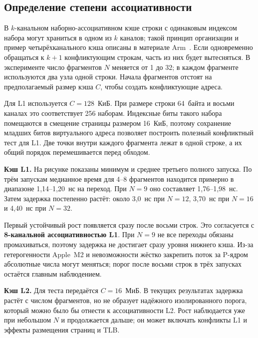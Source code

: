 \subsection{Определение степени ассоциативности}

В $k$-канальном наборно-ассоциативном кэше строки с одинаковым индексом набора могут храниться в одном из $k$ каналов; такой принцип организации и пример четырёхканального кэша описаны в материале Arm~\cite{arm-assoc}. Если одновременно обращаться к $k+1$ конфликтующим строкам, часть из них будет вытесняться. В эксперименте число фрагментов $N$ меняется от 1 до 32; в каждом фрагменте используются два узла одной строки. Начала фрагментов отстоят на предполагаемый размер кэша $C$, чтобы создать конфликтующие адреса.

Для L1 используется $C=128$~КиБ. При размере строки 64~байта и восьми каналах это соответствует 256 наборам. Индексные биты такого набора помещаются в смещение страницы размером 16~КиБ, поэтому сохранение младших битов виртуального адреса позволяет построить полезный конфликтный тест для L1. Две точки внутри каждого фрагмента лежат в одной строке, а их общий порядок перемешивается перед обходом.

\textbf{Кэш L1.} На рисунке показаны минимум и среднее третьего полного запуска. По трём запускам медианное время для 4--8 фрагментов находится примерно в диапазоне 1,14--1,20~нс на переход. При $N=9$ оно составляет 1,76--1,98~нс. Затем задержка постепенно растёт: около 3,0~нс при $N=12$, 3,70~нс при $N=16$ и 4,40~нс при $N=32$.


Первый устойчивый рост появляется сразу после восьми строк. Это согласуется с \textbf{8-канальной ассоциативностью L1}. При $N=9$ не все переходы обязаны промахиваться, поэтому задержка не достигает сразу уровня нижнего кэша. Из-за гетерогенности Apple~M2 и невозможности жёстко закрепить поток за P-ядром абсолютные числа могут меняться; порог после восьми строк в трёх запусках остаётся главным наблюдением.

\textbf{Кэш L2.} Для теста передаётся $C=16$~МиБ. В текущих результатах задержка растёт с числом фрагментов, но не образует надёжного изолированного порога, который можно было бы отнести к ассоциативности L2. Рост наблюдается уже при небольшом $N$ и продолжается дальше; он может включать конфликты L1 и эффекты размещения страниц и TLB.


